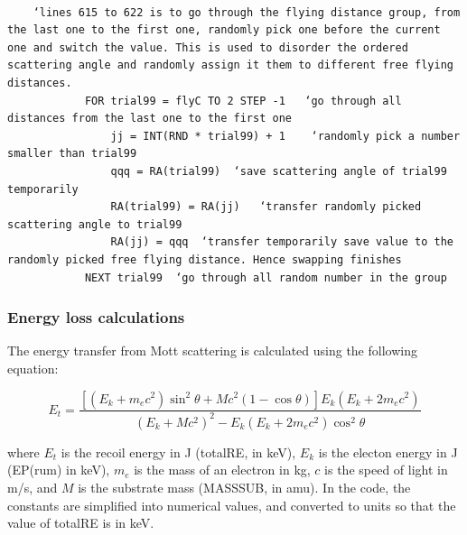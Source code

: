 \documentclass[10pt, reqno]{exam}
\begin{document}
\begin{verbatim}
    
    ‘lines 615 to 622 is to go through the flying distance group, from the last one to the first one, randomly pick one before the current one and switch the value. This is used to disorder the ordered scattering angle and randomly assign it them to different free flying distances. 
            FOR trial99 = flyC TO 2 STEP -1   ‘go through all distances from the last one to the first one
                jj = INT(RND * trial99) + 1    ‘randomly pick a number smaller than trial99
                qqq = RA(trial99)  ‘save scattering angle of trial99 temporarily 
                RA(trial99) = RA(jj)   ‘transfer randomly picked scattering angle to trial99
                RA(jj) = qqq  ‘transfer temporarily save value to the randomly picked free flying distance. Hence swapping finishes
            NEXT trial99  ‘go through all random number in the group
\end{verbatim}

\subsubsection{Energy loss calculations}

The energy transfer from Mott scattering is calculated using the following equation:

\begin{equation}
    E_t = \frac{[(E_k + m_ec^2) \sin^2\theta + Mc^2 (1 - \cos\theta)]E_k(E_k + 2m_ec^2)}{(E_k + Mc^2)^2 - E_k(E_k + 2m_ec^2)\cos^2\theta}
\end{equation}

where $E_t$ is the recoil energy in J (totalRE, in keV), $E_k$ is the electon energy in J (EP(rum) in keV), $m_e$ is the mass of an electron in kg, $c$ is the speed of light in \si{m/s}, and $M$ is the substrate mass (MASSSUB, in amu). In the code, the constants are simplified into numerical values, and converted to units so that the value of totalRE is in keV. \par
\end{document}
